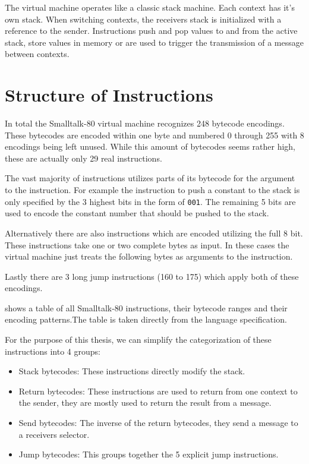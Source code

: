 
The virtual machine operates like a classic stack machine. Each context has it's own stack. When switching contexts, the receivers stack is initialized with a reference to the sender. Instructions push and pop values to and from the active stack, store values in memory or are used to trigger the transmission of a message between contexts. 

\section{Structure of Instructions}
In total the Smalltalk-80 virtual machine recognizes 248 bytecode encodings. These bytecodes are encoded within one byte and numbered 0 through 255 with 8 encodings being left unused. 
While this amount of bytecodes seems rather high, these are actually only 29 real instructions. 

The vast majority of instructions utilizes parts of its bytecode for the argument to the instruction. For example the instruction to push a constant to the stack is only specified by the 3 highest bits in the form of \texttt{001}. The remaining 5 bits are used to encode the constant number that should be pushed to the stack. 

Alternatively there are also instructions which are encoded utilizing the full 8 bit. These instructions take one or two complete bytes as input. In these cases the virtual machine just treats the following bytes as arguments to the instruction. 

Lastly there are 3 long jump instructions (160 to 175) which apply both of these encodings.

 shows a table of all Smalltalk-80 instructions, their bytecode ranges and their encoding patterns.The table is taken directly from the language specification.


For the purpose of this thesis, we can simplify the categorization of these instructions into 4 groups: 
\begin{itemize}
  \item Stack bytecodes: These instructions directly modify the stack. 
  \item Return bytecodes: These instructions are used to return from one context to the sender, they are mostly used to return the result from a message. 
  \item Send bytecodes: The inverse of the return bytecodes, they send a message to a receivers selector.
  \item Jump bytecodes: This groups together the 5 explicit jump instructions.
\end{itemize}

